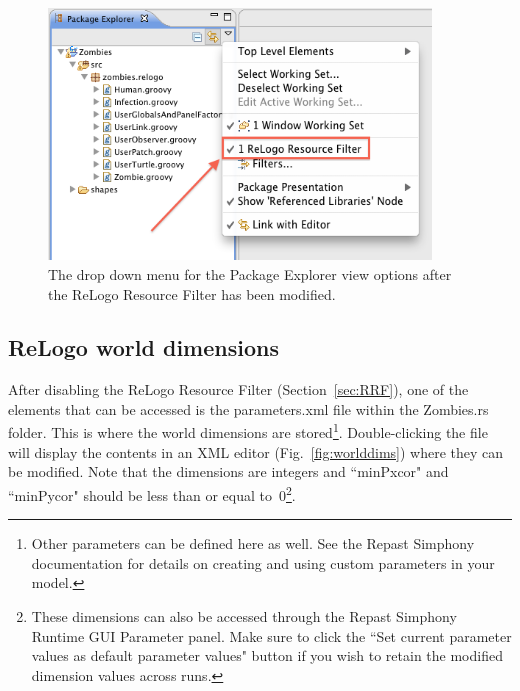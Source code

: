 \documentclass[11pt]{amsart}
\begin{document}
\begin{figure}
\begin{center}
\vspace{.2in}
\centerline {
\includegraphics[width=4in]{GettingStartedImages/PackageExplorerFIlter.png}
}
\caption{The drop down menu for the Package Explorer view options after the ReLogo Resource Filter has been modified.}
\label{fig:resourcefilter}
\end{center}
\end{figure}

\subsection{ReLogo world dimensions}
After disabling the ReLogo Resource Filter (Section~\ref{sec:RRF}), one of the elements that can be accessed is the parameters.xml file within the Zombies.rs folder. This is where the world dimensions are stored\footnote{Other parameters can be defined here as well. See the Repast Simphony documentation for details on creating and using custom parameters in your model.}. Double-clicking the file will display the contents in an XML editor (Fig.~\ref{fig:worlddims}) where they can be modified. Note that the dimensions are integers and  ``minPxcor" and  ``minPycor" should be less than or equal to~0\footnote{These dimensions can also be accessed through the Repast Simphony Runtime GUI Parameter panel. Make sure to click the ``Set current parameter values as default parameter values" button if you wish to retain the modified dimension values across runs.}.
\end{document}

